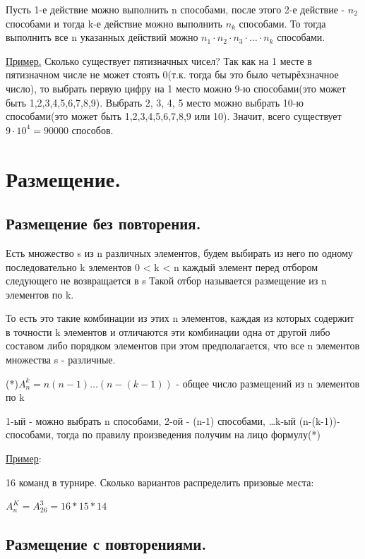 \documentclass[12pt, a4paper, oneside]{article}
\theoremstyle{plain} %
\theoremstyle{definition}
\begin{document}
Пусть 1-е действие можно выполнить n способами, после этого 2-е действие - $n_2$ способами и тогда k-е действие можно выполнить $n_k$ способами. То тогда выполнить все n указанных действий можно $n_1 \cdot n_2 \cdot n_3 \cdot \dots \cdot n_k$ способами. \par 

\underline{Пример.} Сколько существует пятизначных чисел? 
Так как на 1 месте в пятизначном числе не может стоять 0(т.к. тогда бы это было четырёхзначное число), то выбрать первую цифру на 1 место можно 9-ю способами(это может быть 1,2,3,4,5,6,7,8,9). Выбрать 2, 3, 4, 5 место можно выбрать 10-ю способами(это может быть 1,2,3,4,5,6,7,8,9 или 10). Значит, всего существует $9 \cdot 10^4 = 90000$ способов.


\section{Размещение.}


\subsection{Размещение без повторения.}

Есть множество s  из n различных элементов, будем выбирать из него по одному последовательно k элементов 0 < k < n каждый элемент перед отбором следующего не возвращается в s Такой отбор называется размещение из n элементов по k. 

То есть это такие комбинации из этих n элементов, каждая из которых содержит в точности k элементов и отличаются эти комбинации одна от другой либо составом либо порядком элементов при этом предполагается, что все n элементов множества s - различные. 

(*)$A_n^k = n (n-1) \dots (n-(k - 1))$ - общее число размещений из n элементов по k 

1-ый - можно выбрать n способами, 2-ой - (n-1) способами, \dots k-ый (n-(k-1))- способами, тогда по правилу произведения получим на лицо формулу(*)

\underline{Пример}:

16 команд в турнире. Сколько вариантов распределить призовые места:

$A_n^K = A_{26}^3 = 16*15*14$

\subsection{Размещение с повторениями.}
\end{document}
